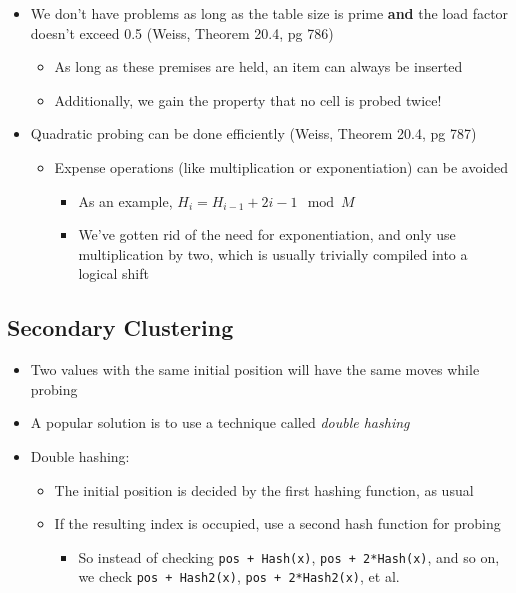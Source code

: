 \documentclass[
  10pt,
  english,
  letterpaper,
,tablecaptionabove
]{scrartcl}
\newcommand{\passthrough}[1]{#1}
\providecommand{\tightlist}{%
  \setlength{\itemsep}{0pt}\setlength{\parskip}{0pt}}
\begin{document}
\begin{itemize}
\tightlist
\item
  We don't have problems as long as the table size is prime \textbf{and}
  the load factor doesn't exceed 0.5 (Weiss, Theorem 20.4, pg 786)

  \begin{itemize}
  \tightlist
  \item
    As long as these premises are held, an item can always be inserted
  \item
    Additionally, we gain the property that no cell is probed twice!
  \end{itemize}
\item
  Quadratic probing can be done efficiently (Weiss, Theorem 20.4, pg
  787)

  \begin{itemize}
  \tightlist
  \item
    Expense operations (like multiplication or exponentiation) can be
    avoided

    \begin{itemize}
    \tightlist
    \item
      As an example, \(H_i = H_{i-1} + 2i - 1 \mod M\)
    \item
      We've gotten rid of the need for exponentiation, and only use
      multiplication by two, which is usually trivially compiled into a
      logical shift
    \end{itemize}
  \end{itemize}
\end{itemize}

\hypertarget{secondary-clustering}{%
\subsection{Secondary Clustering}\label{secondary-clustering}}

\begin{itemize}
\tightlist
\item
  Two values with the same initial position will have the same moves
  while probing
\item
  A popular solution is to use a technique called \emph{double hashing}
\item
  Double hashing:

  \begin{itemize}
  \tightlist
  \item
    The initial position is decided by the first hashing function, as
    usual
  \item
    If the resulting index is occupied, use a second hash function for
    probing

    \begin{itemize}
    \tightlist
    \item
      So instead of checking \passthrough{\lstinline!pos + Hash(x)!},
      \passthrough{\lstinline!pos + 2*Hash(x)!}, and so on, we check
      \passthrough{\lstinline!pos + Hash2(x)!},
      \passthrough{\lstinline!pos + 2*Hash2(x)!}, et al.
    \end{itemize}
  \end{itemize}
\end{itemize}
\end{document}
